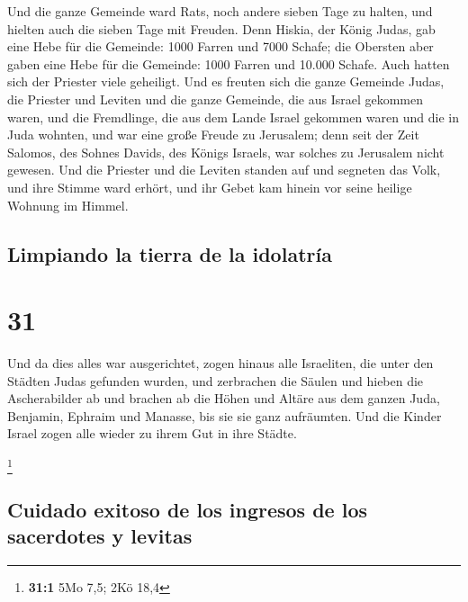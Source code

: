  Und die ganze Gemeinde ward Rats, noch andere sieben
Tage zu halten, und hielten auch die sieben Tage mit Freuden.
 Denn Hiskia, der König Judas, gab eine Hebe für die
Gemeinde: 1000 Farren und 7000 Schafe; die Obersten aber gaben eine Hebe
für die Gemeinde: 1000 Farren und 10.000 Schafe. Auch hatten sich der
Priester viele geheiligt.  Und es freuten sich die ganze
Gemeinde Judas, die Priester und Leviten und die ganze Gemeinde, die aus
Israel gekommen waren, und die Fremdlinge, die aus dem Lande Israel
gekommen waren und die in Juda wohnten,  und war eine
große Freude zu Jerusalem; denn seit der Zeit Salomos, des Sohnes
Davids, des Königs Israels, war solches zu Jerusalem nicht gewesen.
 Und die Priester und die Leviten standen auf und
segneten das Volk, und ihre Stimme ward erhört, und ihr Gebet kam hinein
vor seine heilige Wohnung im Himmel.

\hypertarget{limpiando-la-tierra-de-la-idolatruxeda}{%
\subsection{Limpiando la tierra de la
idolatría}\label{limpiando-la-tierra-de-la-idolatruxeda}}

\hypertarget{section-30}{%
\section{31}\label{section-30}}

 Und da dies alles war ausgerichtet, zogen hinaus alle
Israeliten, die unter den Städten Judas gefunden wurden, und zerbrachen
die Säulen und hieben die Ascherabilder ab und brachen ab die Höhen und
Altäre aus dem ganzen Juda, Benjamin, Ephraim und Manasse, bis sie sie
ganz aufräumten. Und die Kinder Israel zogen alle wieder zu ihrem Gut in
ihre Städte.

\footnote{\textbf{31:1} 5Mo 7,5; 2Kö 18,4}

\hypertarget{cuidado-exitoso-de-los-ingresos-de-los-sacerdotes-y-levitas}{%
\subsection{Cuidado exitoso de los ingresos de los sacerdotes y
levitas}\label{cuidado-exitoso-de-los-ingresos-de-los-sacerdotes-y-levitas}}

